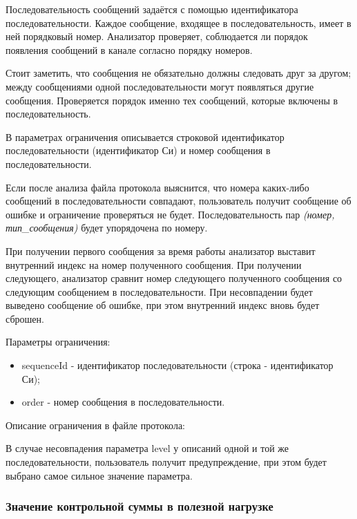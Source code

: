 Последовательность сообщений задаётся с помощью идентификатора 
последовательности. Каждое сообщение, входящее в последовательность, имеет в 
ней порядковый номер. Анализатор проверяет, соблюдается ли порядок появления 
сообщений в канале согласно порядку номеров.

Стоит заметить, что сообщения не обязательно должны следовать друг за другом; 
между сообщениями одной последовательности могут появляться другие сообщения. 
Проверяется порядок именно тех сообщений, которые включены в последовательность.

В параметрах ограничения описывается строковой идентификатор последовательности 
(идентификатор Си) и номер сообщения в последовательности. 

Если после анализа файла протокола выяснится, что номера каких-либо сообщений в 
последовательности совпадают, пользователь получит сообщение об ошибке и 
ограничение проверяться не будет. Последовательность пар \textit{(номер, 
тип\_сообщения)} будет упорядочена по номеру.

При получении первого сообщения за время работы анализатор выставит внутренний
индекс на номер полученного сообщения. При получении следующего, анализатор
сравнит номер следующего полученного сообщения со следующим сообщением в 
последовательности. При несовпадении будет выведено сообщение об ошибке,
при этом внутренний индекс вновь будет сброшен.

Параметры ограничения:

\begin{itemize}
 \item sequenceId - идентификатор последовательности (строка - идентификатор 
Си);
 \item order - номер сообщения в последовательности.
\end{itemize}

Описание ограничения в файле протокола:



В случае несовпадения параметра level у описаний одной и той же 
последовательности, пользователь получит предупреждение, при этом будет выбрано 
самое сильное значение параметра.

\subsubsection{Значение контрольной суммы в полезной нагрузке}

